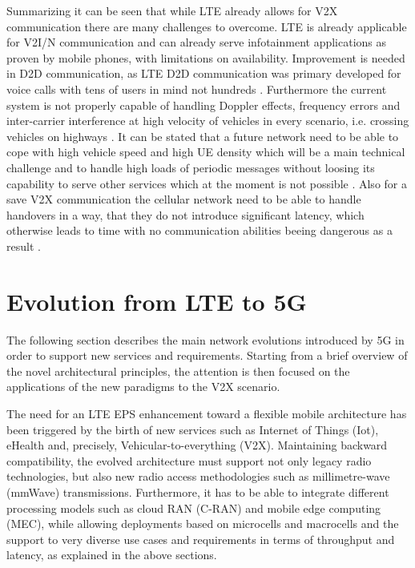 \documentclass[conference,12pt,onecolumn]{IEEEtran}
\begin{document}
Summarizing it can be seen that while LTE already allows for V2X communication there are many challenges to overcome. LTE is already applicable for V2I/N communication \cite{seo2016} and can already serve infotainment applications as proven by mobile phones, with limitations on availability. Improvement is needed in D2D communication, as LTE D2D communication was primary developed for voice calls with tens of users in mind not hundreds \cite{seo2016}. Furthermore the current system is not properly capable of handling Doppler effects, frequency errors and inter-carrier interference at high velocity of vehicles in every scenario, i.e. crossing vehicles on highways \cite{seo2016}. It can be stated that a future network need to be able to cope with high vehicle speed and high UE density which will be a main technical challenge \cite{seo2016} and to handle high loads of periodic messages without loosing its capability to serve other services \cite{lee2016} which at the moment is not possible \cite{lee2016}. Also for a save V2X communication the cellular network need to be able to handle handovers in a way, that they do not introduce significant latency, which otherwise leads to time with no communication abilities beeing dangerous as a result \cite{seo2016}.

\section{Evolution from LTE to 5G}

The following section describes the main network evolutions introduced by 5G in order to support new services and requirements. Starting from a brief overview of the novel architectural principles, the attention is then focused on the applications of the new paradigms to the V2X scenario.

The need for an LTE EPS enhancement toward a flexible mobile architecture has been triggered by the birth of new services such as Internet of Things (Iot), eHealth and, precisely, Vehicular-to-everything (V2X). Maintaining backward compatibility, the evolved architecture must support not only legacy radio technologies, but also new radio access methodologies such as millimetre-wave (mmWave) transmissions. Furthermore, it has to be able to integrate different processing models such as cloud RAN (C-RAN) and mobile edge computing (MEC), while allowing deployments  based on microcells and macrocells and the support to very diverse use cases and requirements in terms of throughput and latency, as explained in the above sections.
\end{document}
